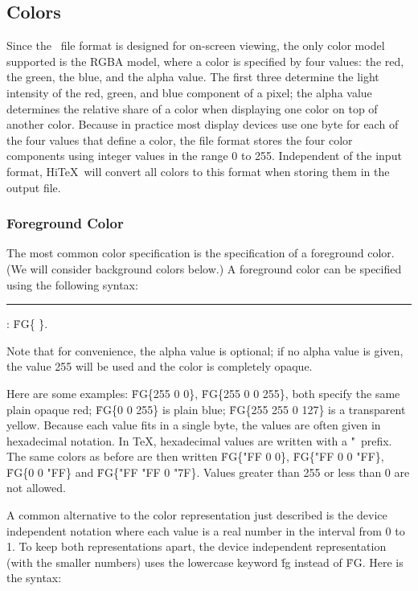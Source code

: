 \subsection{Colors}
Since the \HINT\ file format is designed for on-screen viewing,
the only color model supported is the RGBA model, where a color is
specified by four values: the red, the green, the blue, and the alpha
value. The first three determine the light intensity of the red,
green, and blue component of a pixel; the alpha value determines
the relative share of a color when displaying
one color on top of another color.
Because in practice most display devices use one byte for
each of the four values that define a color, the \HINT file
format stores the four color
components using integer values in the range 0 to 255.
Independent of the input format, Hi\TeX\ will convert all
colors to this format when storing them in the output file.

\subsubsection{Foreground Color}
The most common color specification is the specification of a
foreground color. (We will consider background colors below.)
A foreground color can be specified using
the following syntax:

\medskip
\rule{}:
   \.{FG\{}     \.{\}}.
\medskip

Note that for convenience, the alpha value
is optional; if no alpha value is given, the value 255 will be used
and the color is completely opaque.

Here are some examples:
\.{FG\{255 0 0\}}, \.{FG\{255 0 0 255\}},
both specify the same plain opaque red;
\.{FG\{0 0 255\}} is plain blue;
\.{FG\{255 255 0 127\}} is  a transparent yellow.
Because each value fits in a single byte, the values are often given in
hexadecimal notation. In \TeX, hexadecimal values are written with
a \.{"}~prefix. The same colors as before are then written
\.{FG\{"FF 0 0\}}, \.{FG\{"FF 0 0 "FF\}},
\.{FG\{0 0 "FF\}} and \.{FG\{"FF "FF 0 "7F\}}. 
Values greater than 255 or less than 0 are not allowed.

A common alternative to the color representation just described
is the device independent notation where each
value is a real number in the interval from 0 to 1.
To keep both representations apart, the device independent
representation (with the smaller numbers) uses the lowercase
keyword \.{fg} instead of \.{FG}. Here is the syntax:


